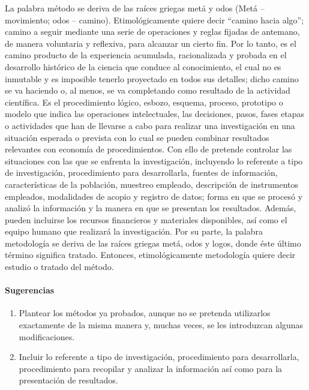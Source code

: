 La palabra método se deriva de las raíces griegas metá y odos (Metá – movimiento; odos – camino). Etimológicamente quiere decir “camino hacia algo”; camino a seguir mediante una serie de operaciones y reglas fijadas de antemano, de manera voluntaria y reflexiva, para alcanzar un cierto fin. Por lo tanto, es el camino producto de la experiencia acumulada, racionalizada y probada en el desarrollo histórico de la ciencia que conduce al conocimiento, el cual no es inmutable y es imposible tenerlo proyectado en todos sus detalles; dicho camino se va haciendo o, al menos, se va completando como resultado de la actividad científica. Es el procedimiento lógico, esbozo, esquema, proceso, prototipo o modelo que indica las operaciones intelectuales, las decisiones, pasos, fases etapas o actividades que han de llevarse a cabo para realizar una investigación en una situación esperada o prevista con lo cual se pueden combinar resultados relevantes con economía de procedimientos. Con ello de pretende controlar las situaciones con las que se enfrenta la investigación, incluyendo lo referente a tipo de investigación, procedimiento para desarrollarla, fuentes de información, características de la población, muestreo empleado, descripción de instrumentos empleados, modalidades de acopio y registro de datos; forma en que se procesó y analizó la información y la manera en que se presentan los resultados. Además, pueden incluirse los recursos financieros y materiales disponibles, así como el equipo humano que realizará la investigación. Por su parte, la palabra metodología se deriva de las raíces griegas metá, odos y logos, donde éste último término significa tratado. Entonces, etimológicamente metodología quiere decir estudio o tratado del método.

\paragraph{Sugerencias}

\begin{enumerate}[noitemsep]
 \item Plantear los métodos ya probados, aunque no se pretenda utilizarlos exactamente de la misma manera y, muchas veces, se les introduzcan algunas modificaciones.
 \item Incluir lo referente a tipo de investigación, procedimiento para desarrollarla, procedimiento para recopilar y analizar la información así como para la presentación de resultados.
\end{enumerate}
